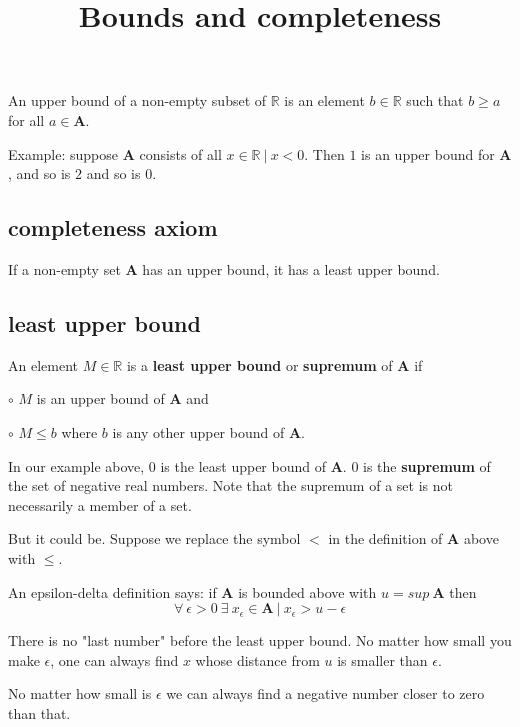 \documentclass[11pt, oneside]{article}
\title{Bounds and completeness}
\date{}
\begin{document}
\maketitle
\Large
An upper bound of a non-empty subset of $\mathbb{R}$ is an element $b \in \mathbb{R}$ such that $b \ge a$ for all $a \in \mathbf{A}$.

Example:  suppose $\mathbf{A}$ consists of all $x \in \mathbb{R} \ | \ x < 0$.  Then $1$ is an upper bound for $\mathbf{A}$, and so is $2$ and so is $0$.

\subsection*{completeness axiom}

If a non-empty set $\mathbf{A}$ has an upper bound, it has a least upper bound.

\subsection*{least upper bound}

An element $M \in \mathbb{R}$ is a \textbf{least upper bound} or \textbf{supremum} of $\mathbf{A}$ if 

$\circ$  $M$ is an upper bound of $\mathbf{A}$ and

$\circ$  $M \le b$ where $b$ is any other upper bound of $\mathbf{A}$.

In our example above, $0$ is the least upper bound of $\mathbf{A}$.  $0$ is the \textbf{supremum} of the set of negative real numbers.  Note that the supremum of a set is not necessarily a member of a set.

But it could be.  Suppose we replace the symbol $<$ in the definition of $\mathbf{A}$ above with $\le$.

An epsilon-delta definition says:  if $\mathbf{A}$ is bounded above with $u = sup \ \mathbf{A}$ then
\[ \forall \ \epsilon > 0 \ \exists \ x_{\epsilon} \in  \mathbf{A} \ | \  x_{\epsilon} > u - \epsilon \]

There is no "last number" before the least upper bound.  No matter how small you make $\epsilon$, one can always find $x$ whose distance from $u$ is smaller than $\epsilon$.

No matter how small is $\epsilon$ we can always find a negative number closer to zero than that.
\end{document}
